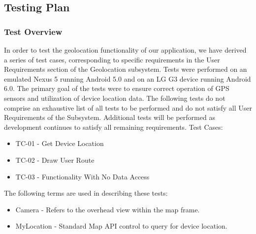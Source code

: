 \documentclass{article}
\begin{document}

\newpage
\subsection{Testing Plan}
\subsubsection{Test Overview}
In order to test the geolocation functionality of our application, we have derived a series of test cases, corresponding to specific requirements in the User Requirements section of the Geolocation subsystem.
Tests were performed on an emulated Nexus 5 running Android 5.0 and on an LG G3 device running Android 6.0. The primary goal of the tests were to ensure correct operation of GPS sensors and utilization of device location data. The following tests do not comprise an exhaustive list of all tests to be performed and do not satisfy all User Requirements of the Subsystem. Additional tests will be performed as development continues to satisfy all remaining requirements.
Test Cases:
\begin{itemize}
\item TC-01 - Get Device Location
\item TC-02 - Draw User Route
\item TC-03 - Functionality With No Data Access
\end {itemize}
The following terms are used in describing these tests:
\begin{itemize}
\item Camera - Refers to the overhead view within the map frame.
\item MyLocation - Standard Map API control to query for device location.
\end {itemize}
\end{document}
